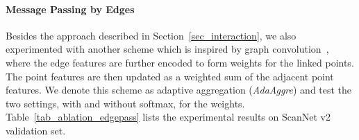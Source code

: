 \documentclass[10pt,twocolumn,letterpaper]{article}
\begin{document}
\begin{table}
	\setlength{\tabcolsep}{7pt}
	\begin{center}
	\end{center}
	\caption{Ablation study results for edge function $f_{edge}$ on ScanNet v2 and S3DIS. The results are shown in format of ScanNet v2 / S3DIS. The ablation on two datasets share similar observation.\vspace{2mm}}
	\label{tab:ablation_edgefunction}
\end{table}

\begin{table}
	\setlength{\tabcolsep}{5pt}
	\begin{center}
	\end{center}
	\caption{Ablation results for message passing by edges.}
	\vspace{-2mm}
	\label{tab_ablation_edgepass}
\end{table}

\vspace{-3mm}
\paragraph{Message Passing by Edges}
\label{sec_edge_usage}
Besides the approach described in Section~\ref{sec_interaction}, we also experimented with another scheme which is inspired by graph convolution~\cite{kipf2016semi, velivckovic2017graph}, where the edge features are further encoded to form weights for the linked points. The point features are then updated as a weighted sum of the adjacent point features. We denote this scheme as adaptive aggregation (\textit{AdaAggre}) and test the two settings, with and without softmax, for the weights.
Table~\ref{tab_ablation_edgepass} lists the experimental results on ScanNet v2 validation set.
\end{document}
